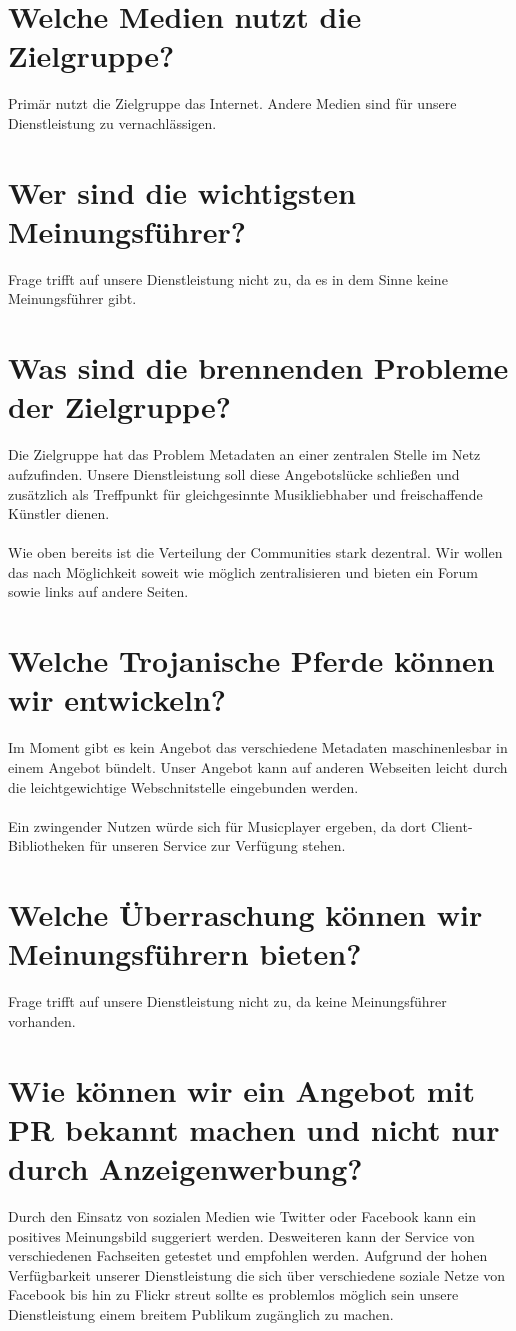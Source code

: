 \section{Welche Medien nutzt die Zielgruppe?}
Primär nutzt die Zielgruppe das Internet. Andere Medien sind für unsere
Dienstleistung zu vernachlässigen.

\section{Wer sind die wichtigsten Meinungsführer?}
Frage trifft auf unsere Dienstleistung nicht zu, da es in dem Sinne keine
Meinungsführer gibt.

\section{Was sind die brennenden Probleme der Zielgruppe?}
Die Zielgruppe hat das Problem Metadaten an einer zentralen Stelle im Netz
aufzufinden. Unsere Dienstleistung soll diese Angebotslücke schließen und
zusätzlich als Treffpunkt für gleichgesinnte Musikliebhaber und freischaffende
Künstler dienen.
\\
\\
Wie oben bereits ist die Verteilung der Communities stark dezentral. Wir wollen
das nach Möglichkeit soweit wie möglich zentralisieren und bieten ein Forum 
sowie links auf andere Seiten.


\section{Welche Trojanische Pferde können wir entwickeln?}
Im Moment gibt es kein Angebot das verschiedene Metadaten maschinenlesbar 
in einem Angebot bündelt. Unser Angebot kann auf anderen Webseiten leicht durch
die leichtgewichtige Webschnitstelle eingebunden werden.
\\
\\
Ein zwingender Nutzen würde sich für Musicplayer ergeben, da dort 
Client-Bibliotheken für unseren Service zur Verfügung stehen.

\section{Welche Überraschung können wir Meinungsführern bieten?}
Frage trifft auf unsere Dienstleistung nicht zu, da keine Meinungsführer
vorhanden.

\section{Wie können wir ein Angebot mit PR bekannt machen und nicht nur durch Anzeigenwerbung?}
Durch den Einsatz von sozialen Medien wie Twitter oder Facebook kann ein
positives Meinungsbild suggeriert werden. Desweiteren kann der Service von
verschiedenen Fachseiten getestet und empfohlen werden. Aufgrund der hohen 
Verfügbarkeit unserer Dienstleistung die sich über verschiedene soziale Netze
von Facebook bis hin zu Flickr streut sollte es problemlos möglich sein unsere
Dienstleistung einem breitem Publikum zugänglich zu machen.

